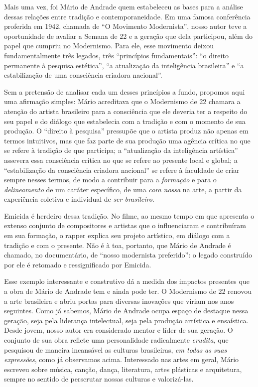 \documentclass[11pt]{extarticle}
\begin{document}
Mais uma vez, foi Mário de Andrade quem estabeleceu as bases para a
análise dessas relações entre tradição e contemporaneidade. Em uma
famosa conferência proferida em 1942, chamada de ``O Movimento
Modernista'', nosso autor teve a oportunidade de avaliar a Semana de 22
e a geração que dela participou, além do papel que cumpriu no
Modernismo. Para ele, esse movimento deixou fundamentalmente três
legados, três ``princípios fundamentais'': ``o direito permanente à
pesquisa estética'', ``a atualização da inteligência brasileira'' e ``a
estabilização de uma consciência criadora nacional''.

Sem a pretensão de analisar cada um desses princípios a fundo, propomos
aqui uma afirmação simples: Mário acreditava que o Modernismo de 22
chamara a atenção do artista brasileiro para a consciência que ele
deveria ter a respeito do seu papel e do diálogo que estabelecia com a
tradição e com o momento de sua produção. O ``direito à pesquisa''
pressupõe que o artista produz não apenas em termos intuitivos, mas que
faz parte de sua produção uma agência crítica no que se refere à
tradição de que participa; a ``atualização da inteligência artística''
assevera essa consciência crítica no que se refere ao presente local e
global; a ``estabilização da consciência criadora nacional'' se refere à
faculdade de criar sempre nesses termos, de modo a contribuir para a
\emph{formação} e para o \emph{delineamento} de um caráter específico,
de uma \emph{cara nossa} na arte, a partir da experiência coletiva e
individual de \emph{ser brasileiro}.

Emicida é herdeiro dessa tradição. No filme, ao mesmo tempo em que
apresenta o extenso conjunto de compositores e artistas que o
influenciaram e contribuíram em sua formação, o rapper explica seu
projeto artístico, em diálogo com a tradição e com o presente. Não é à
toa, portanto, que Mário de Andrade é chamado, no documentário, de
``nosso modernista preferido'': o legado construído por ele é retomado e
ressignificado por Emicida.

Esse exemplo interessante e construtivo dá a medida dos impactos
presentes que a obra de Mário de Andrade tem e ainda pode ter. O
Modernismo de 22 renovou a arte brasileira e abriu portas para diversas
inovações que viriam nos anos seguintes. Como já sabemos, Mário de
Andrade ocupa espaço de destaque nessa geração, seja pela liderança
intelectual, seja pela produção artística e ensaística. Desde jovem,
nosso autor era considerado mentor e líder de sua geração. O conjunto de
sua obra reflete uma personalidade radicalmente \emph{erudita}, que
pesquisou de maneira incansável as culturas brasileiras, \emph{em todas
as suas expressões}, como já observamos acima. Interessado nas artes em
geral, Mário escreveu sobre música, canção, dança, literatura, artes
plásticas e arquitetura, sempre no sentido de perscrutar nossas culturas
e valorizá-las.
\end{document}

